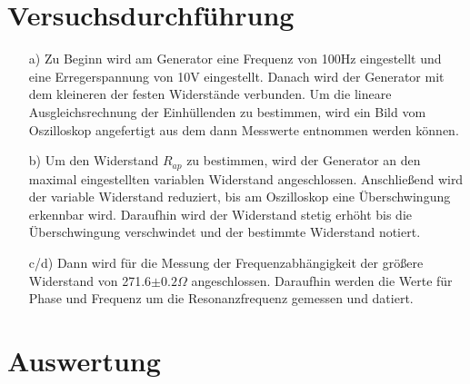 
\section{Versuchsdurchführung}\justifying

 \begin{enumerate}

    \item[a)] \justifying Zu Beginn wird am Generator eine Frequenz von 100Hz 
    eingestellt und eine Erregerspannung von 10V eingestellt. Danach wird der 
    Generator mit dem kleineren der festen Widerstände verbunden.
    Um die lineare Ausgleichsrechnung der Einhüllenden zu bestimmen, wird
    ein Bild vom Oszilloskop angefertigt aus dem dann Messwerte entnommen werden
    können.

    \item[b)] \justifying Um den Widerstand $R_{ap}$ zu bestimmen, wird der Generator 
    an den maximal eingestellten variablen Widerstand angeschlossen. Anschließend wird 
    der variable Widerstand reduziert, bis am Oszilloskop eine Überschwingung erkennbar 
    wird. Daraufhin wird der Widerstand stetig erhöht bis die Überschwingung verschwindet 
    und der bestimmte Widerstand notiert.
  
    \item[c/d)] \justifying Dann wird für die Messung der Frequenzabhängigkeit
                          der größere Widerstand von 271.6$\pm0.2\Omega$ angeschlossen.
                          Daraufhin werden die Werte für Phase und Frequenz um die 
                          Resonanzfrequenz gemessen und datiert.
  
    

  \end{enumerate}


\section{Auswertung}\justifying



